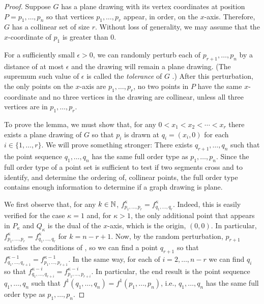 \documentclass{patmorin}
\begin{document}
\begin{proof}
   Suppose $G$ has a plane drawing with its vertex coordinates at position
   $P=p_1,\ldots,p_n$ so that vertices $p_1,\ldots,p_r$ appear, in order,
   on the $x$-axis.  Therefore, $G$ has a collinear set of size $r$.
   Without loss of generality, we may assume that the $x$-coordinate of
   $p_1$ is greater than 0.

   For a sufficiently small $\epsilon>0$, we can randomly perturb each
   of $p_{r+1},\ldots,p_n$ by a distance of at most $\epsilon$ and the
   drawing will remain a plane drawing. (The supremum such value of
   $\epsilon$ is called the \emph{tolerance} of $G$ \cite{X}.)  After this
   perturbation, the only points on the $x$-axis are $p_1,\ldots,p_r$,
   no two points in $P$ have the same $x$-coordinate and no three
   vertices in the drawing are collinear, unless all three vertices are
   in $p_1,\ldots,p_r$.

   To prove the lemma, we must show that, for any $0<x_1<x_2<\cdots<x_r$
   there exists a plane drawing of $G$ so that $p_i$ is drawn at
   $q_i=(x_i,0)$ for each $i\in\{1,\ldots,r\}$.  We will prove
   something stronger: There exists $q_{r+1},\ldots,q_n$ such that
   the point sequence $q_1,\ldots,q_n$ has the same full order type
   as $p_1,\ldots,p_n$. Since the full order type of a point set
   is sufficient to test if two segments cross and to identify, and
   determine the ordering of, collinear points, the full order type
   contains enough information to determine if a graph drawing is plane.

   We first observe that, for any $k\in\mathbb{N}$,
   $f^{\kappa}_{p_1,\ldots,p_r}=f^{\kappa}_{q_1,\ldots,q_r}$.  Indeed,
   this is easily verified for the case $\kappa=1$ and, for $\kappa>1$,
   the only additional point that appears in $P_\kappa$ and $Q_\kappa$ is
   the dual of the $x$-axis, which is the origin, $(0,0)$.  In particular,
   $f^{\kappa}_{p_1,\ldots,p_r}=f^{\kappa}_{q_1,\ldots,q_r}$ for
   $k=n-r+1$.  Now, by the random perturbation, $p_{r+1}$ satisfies the
   conditions of , so we can find a point $q_{r+1}$ so that
   $f^{\kappa-1}_{q_1,\ldots,q_{r+1}}=f^{\kappa-1}_{p_1,\ldots,p_{r+1}}$.
   In the same way, for each of $i=2,\ldots,n-r$ we can
   find $q_i$ so that $f^{\kappa-i}_{q_1,\ldots,q_{r+i}} =
   f^{\kappa-i}_{p_1,\ldots,p_{r+i}}$.  In particular, the
   end result is the point sequence $q_1,\ldots,q_n$ such that
   $f^{1}(q_1,\ldots,q_n)=f^{1}(p_1,\ldots,p_n)$, i.e., $q_1,\ldots,q_n$
   has the same full order type as $p_1,\ldots,p_n$.
\end{proof}
\end{document}
